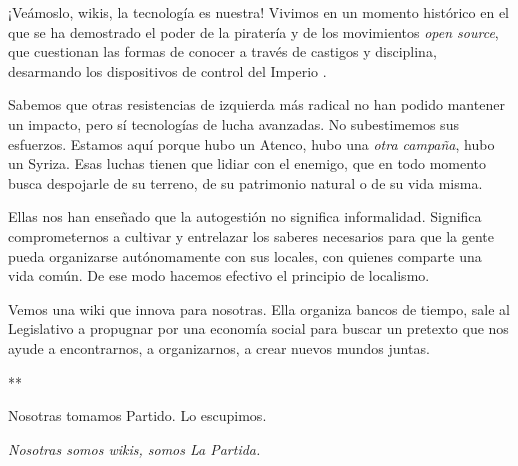 ¡Veámoslo, wikis, la tecnología es nuestra! Vivimos en un momento
histórico en el que se ha demostrado el poder de la piratería y de los
movimientos \emph{open source}, que cuestionan las formas de conocer a
través de castigos y disciplina, desarmando los dispositivos de control
del Imperio \cite{Amin2005}.

Sabemos que otras resistencias de izquierda más radical no han podido
mantener un impacto, pero sí tecnologías de lucha avanzadas. No
subestimemos sus esfuerzos. Estamos aquí porque hubo un Atenco, hubo una
\emph{otra campaña}, hubo un Syriza. Esas luchas tienen que lidiar con
el enemigo, que en todo momento busca despojarle de su terreno, de su
patrimonio natural o de su vida misma.

Ellas nos han enseñado que la autogestión no significa informalidad.
Significa comprometernos a cultivar y entrelazar los saberes necesarios
para que la gente pueda organizarse autónomamente con sus locales, con
quienes comparte una vida común. De ese modo hacemos efectivo el
principio de localismo.

Vemos una wiki que innova para nosotras. Ella organiza bancos de tiempo,
sale al Legislativo a propugnar por una economía social para buscar un
pretexto que nos ayude a encontrarnos, a organizarnos, a crear nuevos
mundos juntas.

**

Nosotras tomamos Partido. Lo escupimos.

\emph{Nosotras somos wikis, somos La Partida.}
